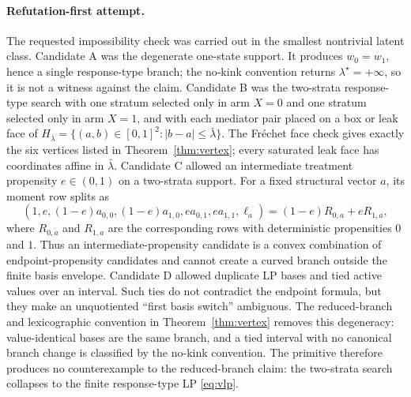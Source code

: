 \documentclass[11pt]{article}
\theoremstyle{definition}
\theoremstyle{plain}
\theoremstyle{remark}
\begin{document}
\paragraph{Refutation-first attempt.}
The requested impossibility check was carried out in the smallest nontrivial latent class. Candidate A was the degenerate one-state support. It produces \(w_0=w_1\), hence a single response-type branch; the no-kink convention returns \(\lambda^\star=+\infty\), so it is not a witness against the claim. Candidate B was the two-strata response-type search with one stratum selected only in arm \(X=0\) and one stratum selected only in arm \(X=1\), and with each mediator pair placed on a box or leak face of \(H_{\bar\lambda}=\{(a,b)\in[0,1]^2:|b-a|\le\bar\lambda\}\). The Fréchet face check gives exactly the six vertices listed in Theorem~\ref{thm:vertex}; every saturated leak face has coordinates affine in \(\bar\lambda\). Candidate C allowed an intermediate treatment propensity \(e\in(0,1)\) on a two-strata support. For a fixed structural vector \(a\), its moment row splits as
\[
  (1,e,(1-e)a_{0,0},(1-e)a_{1,0},ea_{0,1},ea_{1,1},\ell_a)
  = (1-e)R_{0,a}+eR_{1,a},
\]
where \(R_{0,a}\) and \(R_{1,a}\) are the corresponding rows with deterministic propensities \(0\) and \(1\). Thus an intermediate-propensity candidate is a convex combination of endpoint-propensity candidates and cannot create a curved branch outside the finite basis envelope. Candidate D allowed duplicate LP bases and tied active values over an interval. Such ties do not contradict the endpoint formula, but they make an unquotiented ``first basis switch'' ambiguous. The reduced-branch and lexicographic convention in Theorem~\ref{thm:vertex} removes this degeneracy: value-identical bases are the same branch, and a tied interval with no canonical branch change is classified by the no-kink convention. The primitive therefore produces no counterexample to the reduced-branch claim: the two-strata search collapses to the finite response-type LP \eqref{eq:vlp}.
\end{document}
